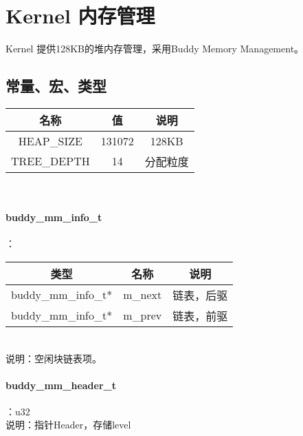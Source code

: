 %
% 
% 
% 
% 
% 
% 
%

\chapter{Kernel 内存管理}
Kernel 提供128KB的堆内存管理，采用Buddy Memory Management。

\section{常量、宏、类型}
\noindent\begin{tabular}{|c|c|c|}
    \hline
    名称 & 值 & 说明\\\hline
    HEAP\_SIZE & 131072 & 128KB\\\hline
    TREE\_DEPTH & 14 & 分配粒度\\\hline
\end{tabular}\\

\subsubsection{buddy\_mm\_info\_t}
：\\
\begin{tabular}{|c|c|c|}
    \hline
    类型 & 名称 & 说明\\\hline
    buddy\_mm\_info\_t* & m\_next & 链表，后驱\\\hline
    buddy\_mm\_info\_t* & m\_prev & 链表，前驱\\\hline
\end{tabular}\\
说明：空闲块链表项。

\subsubsection{buddy\_mm\_header\_t}
：u32\\
说明：指针Header，存储level

